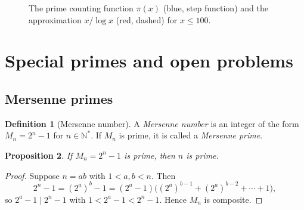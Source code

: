 \documentclass[12pt,a4paper,openany]{book}
\theoremstyle{definition}
\newtheorem{definition}{Definition}[chapter]
\theoremstyle{plain}
\newtheorem{proposition}[definition]{Proposition}
\theoremstyle{remark}
\newcommand{\N}{\mathbb{N}}
\begin{document}
\begin{figure}[ht]
\centering
{}
\caption{The prime counting function $\pi(x)$ (blue, step function) and
  the approximation $x/\!\log x$ (red, dashed) for $x \le 100$.}
\label{fig:prime-counting}
\end{figure}

\section{Special primes and open problems}
\label{sec:special-primes}

\subsection{Mersenne primes}
\label{subsec:mersenne}

\begin{definition}[Mersenne number]
\label{def:mersenne}
A \emph{Mersenne number} is an integer of the form $M_n = 2^n - 1$ for
$n \in \N^{*}$. If $M_n$ is prime, it is called a \emph{Mersenne prime}.
\end{definition}

\begin{proposition}
\label{prop:mersenne-necessary}
If $M_n = 2^n - 1$ is prime, then $n$ is prime.
\end{proposition}

\begin{proof}
Suppose $n = ab$ with $1 < a, b < n$. Then
\[
  2^n - 1 = (2^a)^b - 1 = (2^a - 1)\bigl((2^a)^{b-1} + (2^a)^{b-2} + \cdots + 1\bigr),
\]
so $2^a - 1 \mid 2^n - 1$ with $1 < 2^a - 1 < 2^n - 1$. Hence $M_n$ is composite.
\end{proof}
\end{document}
